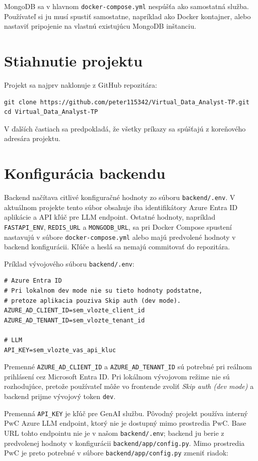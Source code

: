 \documentclass[a4paper, 12pt]{article}
\begin{document}
MongoDB sa v hlavnom \texttt{docker-compose.yml} nespúšťa ako samostatná služba. Používateľ si ju musí spustiť samostatne, napríklad ako Docker kontajner, alebo nastaviť pripojenie na vlastnú existujúcu MongoDB inštanciu.

\section{Stiahnutie projektu}

Projekt sa najprv naklonuje z GitHub repozitára:

\begin{lstlisting}
git clone https://github.com/peter115342/Virtual_Data_Analyst-TP.git
cd Virtual_Data_Analyst-TP
\end{lstlisting}

V ďalších častiach sa predpokladá, že všetky príkazy sa spúšťajú z koreňového adresára projektu.

\section{Konfigurácia backendu}

Backend načítava citlivé konfiguračné hodnoty zo súboru \texttt{backend/.env}. V aktuálnom projekte tento súbor obsahuje iba identifikátory Azure Entra ID aplikácie a API kľúč pre LLM endpoint. Ostatné hodnoty, napríklad \texttt{FASTAPI\_ENV}, \texttt{REDIS\_URL} a \texttt{MONGODB\_URL}, sa pri Docker Compose spustení nastavujú v súbore \texttt{docker-compose.yml} alebo majú predvolené hodnoty v backend konfigurácii. Kľúče a heslá sa nemajú commitovať do repozitára.

Príklad vývojového súboru \texttt{backend/.env}:

\begin{lstlisting}
# Azure Entra ID
# Pri lokalnom dev mode nie su tieto hodnoty podstatne,
# pretoze aplikacia pouziva Skip auth (dev mode).
AZURE_AD_CLIENT_ID=sem_vlozte_client_id
AZURE_AD_TENANT_ID=sem_vlozte_tenant_id

# LLM
API_KEY=sem_vlozte_vas_api_kluc
\end{lstlisting}

Premenné \texttt{AZURE\_AD\_CLIENT\_ID} a \texttt{AZURE\_AD\_TENANT\_ID} sú potrebné pri reálnom prihlásení cez Microsoft Entra ID. Pri lokálnom vývojovom režime nie sú rozhodujúce, pretože používateľ môže vo frontende zvoliť \textit{Skip auth (dev mode)} a backend prijme vývojový token \texttt{dev}.

Premenná \texttt{API\_KEY} je kľúč pre GenAI službu. Pôvodný projekt používa interný PwC Azure LLM endpoint, ktorý nie je dostupný mimo prostredia PwC. Base URL tohto endpointu nie je v našom \texttt{backend/.env}; backend ju berie z predvolenej hodnoty v konfigurácii \texttt{backend/app/config.py}. Mimo prostredia PwC je preto potrebné v súbore \texttt{backend/app/config.py} zmeniť riadok:
\end{document}
